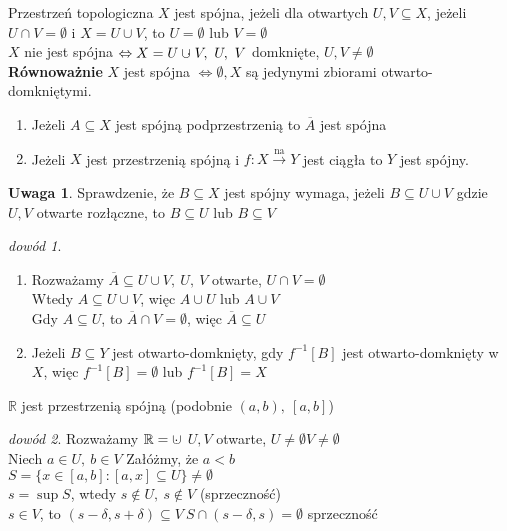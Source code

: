 \documentclass[twoside,10pt]{article}
\theoremstyle{definition}
\theoremstyle{definition}
\theoremstyle{definition}
\theoremstyle{definition}
\theoremstyle{remark}
\newtheorem*{dd}{dowód}
\theoremstyle{definition}
\newtheorem*{uw}{Uwaga}
\theoremstyle{definition}
\theoremstyle{definition}
\theoremstyle{definition}
\theoremstyle{definition}
\theoremstyle{definition}
\begin{document}
\begin{df} 
    Przestrzeń topologiczna $X$ jest spójna, jeżeli dla otwartych $U, V \subseteq X$, 
    jeżeli $U \cap V = \emptyset$ i $X = U \cup V$, to $U = \emptyset$ lub $V = \emptyset$
    \\$X$ nie jest spójna $\Leftrightarrow X = U\cup\mkern-9mu\cdot\mkern5mu V,\ U,\ V$ 
    domknięte, $U,V \neq \emptyset$\\
    \textbf{Równoważnie}  $X$ jest spójna $\Leftrightarrow \emptyset, X$ są jedynymi 
    zbiorami otwarto-domkniętymi.
\end{df} 
\begin{tw} \hfill 
    \begin{enumerate}[(1)]
        \item Jeżeli $A \subseteq X$ jest spójną podprzestrzenią to $\overline A$ jest
            spójna 
        \item Jeżeli $X$ jest przestrzenią spójną i $f: X \xrightarrow{\text{na}} Y$ 
            jest ciągła to $Y$ jest spójny.
    \end{enumerate} 
\end{tw} 
\begin{uw} 
    Sprawdzenie, że $B \subseteq X$ jest spójny wymaga, jeżeli $B \subseteq U \cup V$ 
    gdzie $U, V$ otwarte rozłączne, to $B \subseteq U$ lub $B \subseteq V$
\end{uw} 
\begin{dd} \hfill
    \begin{enumerate}[(1)] 
        \item Rozważamy $\overline A \subseteq U \cup V,\ U,\ V $ otwarte, $U \cap V = 
            \emptyset$ \\ 
            Wtedy $A \subseteq U \cup V$, więc $A \cup U$ lub $A \cup V$ \\ 
            Gdy $A \subseteq U$, to $\overline A \cap V = \emptyset$, więc $\overline A 
            \subseteq U$
        \item Jeżeli $B \subseteq Y$ jest otwarto-domknięty, 
            gdy $f^{-1}[B]$ jest otwarto-domknięty w $X$, więc $f^{-1} [B] = \emptyset$ 
            lub $f^{-1} [B] = X$
    \end{enumerate}
\end{dd} 
\begin{tw} 
    $\mathbb{R}$ jest przestrzenią spójną (podobnie $(a,b),\ [a,b]$)
\end{tw} 
\begin{dd} 
    Rozważamy $\mathbb{R} = \cup\mkern-9mu\cdot\mkern5mu$ $U,V$ otwarte, $U \neq \emptyset
    V \neq \emptyset$ \\ 
    Niech $a \in U,\ b \in V$ Załóżmy, że $a < b$ \\ 
    $S = \{ x \in [a,b]: [a,x] \subseteq U \} \neq \emptyset$ \\ 
    $s = \sup S$, wtedy $s \notin U,\ s \notin V$ (sprzeczność) \\ 
    $s \in V$, to $(s-\delta,s+\delta) \subseteq V \ S \cap (s-\delta,s) = \emptyset$
    sprzeczność
\end{dd} 
\end{document}
